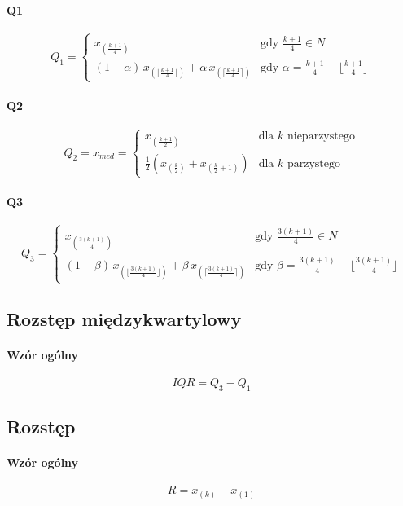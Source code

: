\documentclass[10pt]{article}
\begin{document}
\paragraph{Q1}
\[
Q_{1} =
    \begin{cases}
        x_{(\frac{k+1}{4})} & \text{gdy } \frac{k+1}{4} \in N \\
        (1-\alpha)\,x_{(\lfloor\frac{k+1}{4}\rfloor)} + \alpha\,x_{(\lceil\frac{k+1}{4}\rceil)}
        & \text{gdy } \alpha = \frac{k+1}{4} - \lfloor\frac{k+1}{4}\rfloor
    \end{cases}
\]

\paragraph{Q2}
\[
Q_{2} = x_{med} =
    \begin{cases}
        x_{(\frac{k+1}{2})} & \text{dla } k \text{ nieparzystego} \\
        \frac{1}{2} \left( x_{(\frac{k}{2})} + x_{(\frac{k}{2}+1)} \right)
        & \text{dla } k \text{ parzystego}
    \end{cases}
\]

\paragraph{Q3}
\[
Q_{3} =
    \begin{cases}
        x_{(\frac{3(k+1)}{4})} & \text{gdy } \frac{3(k+1)}{4} \in N \\
        (1-\beta)\,x_{(\lfloor\frac{3(k+1)}{4}\rfloor)} + \beta\,x_{(\lceil\frac{3(k+1)}{4}\rceil)}
        & \text{gdy } \beta = \frac{3(k+1)}{4} - \lfloor\frac{3(k+1)}{4}\rfloor
    \end{cases}
\]

\subsection{Rozstęp międzykwartylowy}
\paragraph{Wzór ogólny}
\[
IQR = Q_{3} - Q_{1}
\]

\subsection{Rozstęp}
\paragraph{Wzór ogólny}
\[
R = x_{(k)} - x_{(1)}
\]
\end{document}
